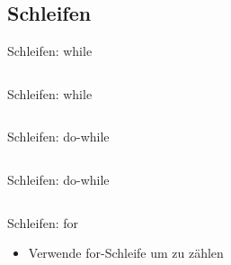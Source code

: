 \documentclass[18pt]{beamer}
\begin{document}
\subsection{Schleifen}

\begin{frame}[fragile]{Schleifen: while}
    \begin{block}{}

    \end{block}
    \pause

    \begin{block}{}
        \begin{lstlisting}[language=Java]

        \end{lstlisting}
    \end{block}
\end{frame}

\begin{frame}[fragile]{Schleifen: while}
    \begin{exampleblock}{}
    \begin{lstlisting}[language=Java]

    \end{lstlisting}
    \end{exampleblock}
\end{frame}

\begin{frame}[fragile]{Schleifen: do-while}
    \begin{block}{}

    \end{block}
    \pause

    \begin{block}{}
        \begin{lstlisting}[language=Java]

        \end{lstlisting}
    \end{block}
\end{frame}

\begin{frame}[fragile]{Schleifen: do-while}
    \begin{exampleblock}{}
    \begin{lstlisting}[language=Java]

    \end{lstlisting}
    \end{exampleblock}
\end{frame}

\begin{frame}[fragile]{Schleifen: for}
    \begin{itemize}
        \item Verwende for-Schleife um zu zählen
    \end{itemize}
\end{frame}
\end{document}
